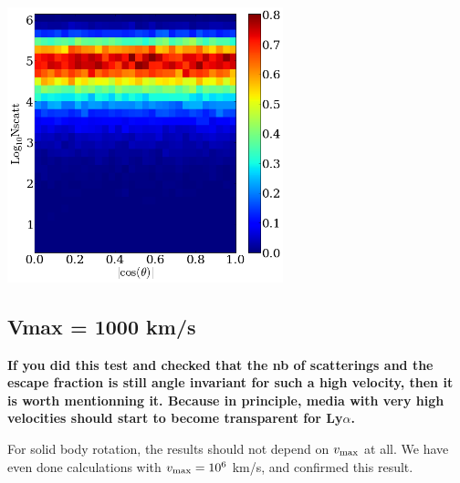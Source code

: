 \documentclass[12pt]{article}
\begin{document}
\begin{center}
\includegraphics[width=0.6\textwidth]{./f9h.png}
\end{center}

\subsection*{Vmax = 1000 km/s}
{\bf If you did this test and checked that the nb of scatterings and
  the escape fraction is still angle invariant for such a high
  velocity, then it is worth mentionning it. Because in principle,
  media with very high velocities should start to become transparent
  for Ly$\alpha$.}  

For solid body rotation, the results should not depend on $v_{\rm
  max}$ at all. We have even done calculations with $v_{\rm max}=10^6$
km/s, and confirmed this result. 
\end{document}
